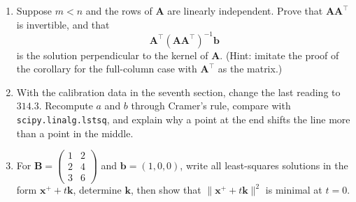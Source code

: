 \begin{latihan}
\begin{enumerate}
  \item Suppose $m<n$ and the rows of $\mathbf{A}$ are linearly independent. Prove that
        $\mathbf{A}\mathbf{A}^{\top}$ is invertible, and that
        \[ \mathbf{A}^{\top}(\mathbf{A}\mathbf{A}^{\top})^{-1}\mathbf{b} \]
        is the solution perpendicular to the kernel of $\mathbf{A}$. (Hint: imitate the proof of the
        corollary for the full-column case with $\mathbf{A}^{\top}$ as the matrix.)

  \item With the calibration data in the seventh section, change the last reading to
        $314.3$. Recompute $a$ and $b$ through Cramer's rule, compare with
        \texttt{scipy.linalg.lstsq}, and explain why a point at the end shifts the line
        more than a point in the middle.

  \item For $\mathbf{B}=\begin{pmatrix}1&2\\ 2&4\\ 3&6\end{pmatrix}$ and
        $\mathbf{b}=(1,0,0)$, write all least-squares solutions in the form
        $\mathbf{x}^{+}+t\mathbf{k}$, determine $\mathbf{k}$, then show that
        $\|\mathbf{x}^{+}+t\mathbf{k}\|^{2}$ is minimal at $t=0$.
\end{enumerate}
\end{latihan}

